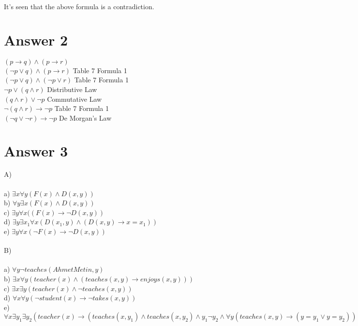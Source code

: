 \documentclass[12pt]{article}
\begin{document}
It's seen that the above formula is a contradiction.

\section*{Answer 2}

$(p \to q) \wedge (p \to r) $  \quad \quad \quad \\
$(\neg p \vee q) \wedge (p \to r) $ \quad \quad \quad Table 7 Formula 1\\
$(\neg p \vee q) \wedge (\neg p \vee r) $ \quad \quad \quad  Table 7 Formula 1\\
$\neg p \vee (q \wedge r) $ \quad \quad  \quad \quad \quad \quad Distributive Law\\
$(q\wedge r) \vee \neg p $  \quad \quad \quad \quad \quad \quad Commutative Law \\
$\neg (q \wedge r ) \to \neg p$ \quad \quad \quad \quad \quad Table 7 Formula 1\\
$(\neg q \vee \neg r) \to \neg p $ \quad \quad \quad \quad De Morgan's Law\\



\section*{Answer 3}

A) \\
\\
a) $\exists x \forall y(F(x) \wedge D(x,y))$ \\
b) $\forall y \exists x (F(x) \wedge D(x,y)) $ \\
c) $ \exists y \forall x( (F(x) \to \neg  D(x,y)) $ \\
d) $ \exists y \exists x_1 \forall x( D(x_1,y) \wedge( D(x,y) \to x=x_1) ) $ \\
e) $ \exists y \forall x ( \neg F(x) \to \neg D(x,y)) $ \\
\\
B)\\
\\
a) $ \forall y \neg teaches(Ahmet Metin,y) $ \\
b) $ \exists x \forall y(teacher(x) \wedge (teaches(x,y) \to enjoys(x,y))) $ \\
c) $ \exists x \exists y (teacher(x) \wedge \neg teaches(x,y)) $ \\
d) $ \forall x \forall y( \neg student(x) \to \neg takes(x,y)) $ \\
e) $ \forall x \exists y_1 \exists y_2( teacher(x) \to ( teaches(x,y_1) \wedge teaches(x,y_2) \wedge y_1 \neg y_2 \wedge \forall y(teaches(x,y) \to (y=y_1 \vee y=y_2)))) $ \\
\end{document}

